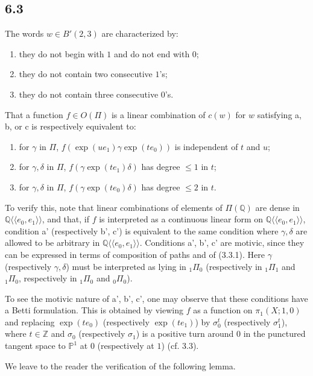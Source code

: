\documentclass[10pt]{article}
\newcommand{\Q}{\mathbb Q}
\newcommand{\Z}{\mathbb Z}
\newcommand{\PP}{\mathbb P}
\begin{document}
\subsection*{6.3}
The words $w\in B'(2,3)$ are characterized by:
\begin{enumerate}[label=\alph*.]
\item they do not begin with $1$ and do not end with $0$;
\item they do not contain two consecutive $1$'s;
\item they do not contain three consecutive $0$'s.
\end{enumerate}
That a function $f\in O(\Pi)$ is a linear combination of $c(w)$ for $w$ satisfying a, b, or c is respectively equivalent to:
\begin{enumerate}[label=\alph*'.]
\item for $\gamma$ in $\Pi$, $f(\exp(ue_1)\gamma\exp(te_0))$ is independent of $t$ and $u$;
\item for $\gamma,\delta$ in $\Pi$, $f(\gamma\exp(te_1)\delta)$ has degree $\leq1$ in $t$;
\item for $\gamma,\delta$ in $\Pi$, $f(\gamma\exp(te_0)\delta)$ has degree $\leq2$ in $t$.
\end{enumerate}
To verify this, note that linear combinations of elements of $\Pi(\Q)$ are dense in $\Q\langle\!\langle e_0,e_1\rangle\!\rangle$, and that, if $f$ is interpreted as a continuous linear form on $\Q\langle\!\langle e_0,e_1\rangle\!\rangle$, condition a' (respectively b', c') is equivalent to the same condition where $\gamma,\delta$ are allowed to be arbitrary in $\Q\langle\!\langle e_0,e_1\rangle\!\rangle$. Conditions a', b', c' are motivic, since they can be expressed in terms of composition of paths and of (3.3.1). Here $\gamma$ (respectively $\gamma,\delta$) must be interpreted as lying in ${}_1\Pi_0$ (respectively in ${}_1\Pi_1$ and ${}_1\Pi_0$, respectively in ${}_1\Pi_0$ and ${}_0\Pi_0$).

To see the motivic nature of a', b', c', one may observe that these conditions have a Betti formulation. This is obtained by viewing $f$ as a function on $\pi_1(X;1,0)$ and replacing $\exp(te_0)$ (respectively $\exp(te_1)$) by $\sigma_0^t$ (respectively $\sigma_1^t$), where $t\in\Z$ and $\sigma_0$ (respectively $\sigma_1$) is a positive turn around $0$ in the punctured tangent space to $\PP^1$ at $0$ (respectively at $1$) (cf. 3.3).

We leave to the reader the verification of the following lemma.
\end{document}
